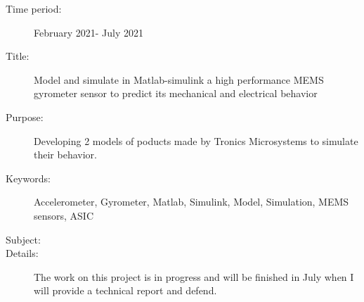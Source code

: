 \documentclass[a4paper,10pt]{article}
\begin{document}
\begin{description}
    \item[Time period:] February 2021- July 2021
    \item[Title:] Model and simulate in Matlab-simulink a high performance MEMS gyrometer sensor to predict its mechanical and electrical behavior
    \item[Purpose:] Developing 2 models of poducts made by Tronics Microsystems to simulate their behavior.
    \item[Keywords:] Accelerometer, Gyrometer, Matlab, Simulink, Model, Simulation, MEMS sensors, ASIC
    \item[Subject:] %
    \item[Details:] %

          The work on this project is in progress and will be finished in July when I will provide a technical report and defend.
\end{description}
\end{document}
